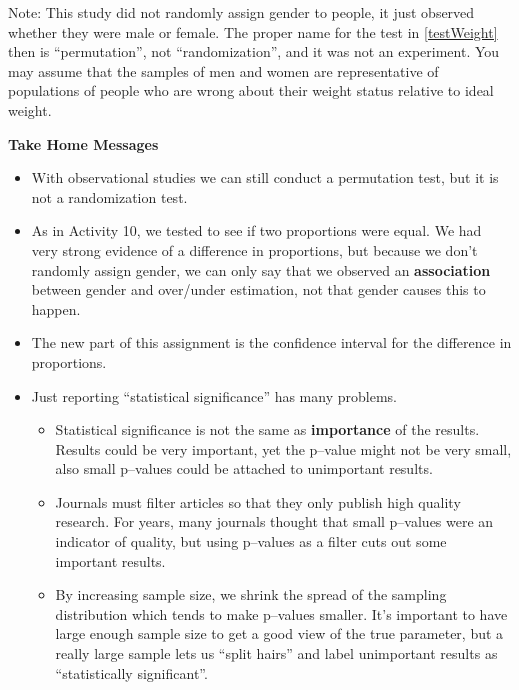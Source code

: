 \begin{enumerate}
  Note: This study did not randomly assign gender to people, it just
  observed whether they were male or female. The proper name for the
  test in \ref{testWeight} then is ``permutation'', not
  ``randomization'', and it was not 
  an experiment.  You may assume that the samples of men and women are
  representative of populations of people who are wrong about their
  weight status relative to ideal weight.\vspace{2in}

\end{enumerate}

\begin{center}
  {\bf Take Home Messages}
\end{center}
  \begin{itemize}
  \item With observational studies we can still conduct a permutation
    test, but it is not  a randomization test.
  \item As in Activity 10, we tested to see if  two proportions were
    equal. We had very strong evidence of a difference in proportions,
    but because we don't randomly assign gender, we can only say that
    we observed an {\bf association} between gender and over/under
    estimation, not that gender causes this to happen.
  \item The new part of this assignment is the confidence interval for
    the difference in proportions. 
  \item Just reporting ``statistical significance'' has many problems.
    \begin{itemize}
    \item Statistical significance is not the same as {\bf importance}
      of the results.  Results could be very important, yet the
      p--value might not be very small, also small p--values could be
      attached to unimportant results.

    \item Journals must filter articles so that they only publish high quality
      research. For years, many journals thought that small p--values
      were an indicator of quality, but using p--values as a filter
      cuts out some important results. 

    \item By increasing sample size, we shrink the spread of the
      sampling distribution which tends to make p--values
      smaller. It's important to have large enough sample size to
      get a good view of the true parameter, but a really large sample
      lets us ``split hairs'' and label unimportant results as
      ``statistically significant''.


\end{itemize}
\end{itemize}
